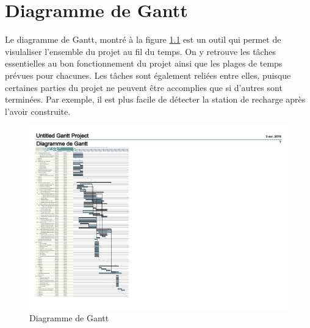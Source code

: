 \chapter{Diagramme de Gantt}

Le diagramme de Gantt, montré à la figure \ref{fig:Gantt} est un outil qui permet de visulaliser l'ensemble du projet au fil du temps.
On y retrouve les tâches essentielles au bon fonctionnement du projet ainsi que les plages de temps prévues pour chacunes.
Les tâches sont également reliées entre elles, puisque certaines parties du projet ne peuvent être accomplies que si d'autres sont terminées.
Par exemple, il est plus facile de détecter la station de recharge après l'avoir construite.

\begin{figure}[ht]
    \centering
    \includegraphics[scale=1, trim = 0 0 16cm 2.5cm, clip]{resources/gantt.pdf}
    \caption{Diagramme de Gantt}
    \label{fig:Gantt}
  \end{figure}
